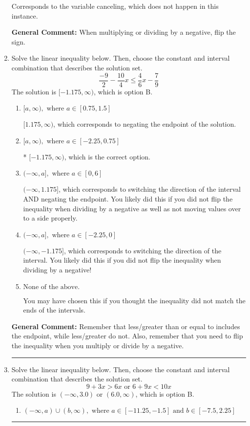 \documentclass{extbook}[14pt]
\newcommand{\litem}[1]{\item #1

\rule{\textwidth}{0.4pt}}
\begin{document}
\begin{enumerate}
{\begin{enumerate}[label=\Alph*.]
Corresponds to the variable canceling, which does not happen in this instance.
\end{enumerate}

\textbf{General Comment:} When multiplying or dividing by a negative, flip the sign.
}
\litem{
Solve the linear inequality below. Then, choose the constant and interval combination that describes the solution set.
\[ \frac{-9}{2} - \frac{10}{4} x \leq \frac{4}{6} x - \frac{7}{9} \]The solution is \( [-1.175, \infty) \), which is option B.\begin{enumerate}[label=\Alph*.]
\item \( [a, \infty), \text{ where } a \in [0.75, 1.5] \)

 $[1.175, \infty)$, which corresponds to negating the endpoint of the solution.
\item \( [a, \infty), \text{ where } a \in [-2.25, 0.75] \)

* $[-1.175, \infty)$, which is the correct option.
\item \( (-\infty, a], \text{ where } a \in [0, 6] \)

 $(-\infty, 1.175]$, which corresponds to switching the direction of the interval AND negating the endpoint. You likely did this if you did not flip the inequality when dividing by a negative as well as not moving values over to a side properly.
\item \( (-\infty, a], \text{ where } a \in [-2.25, 0] \)

 $(-\infty, -1.175]$, which corresponds to switching the direction of the interval. You likely did this if you did not flip the inequality when dividing by a negative!
\item \( \text{None of the above}. \)

You may have chosen this if you thought the inequality did not match the ends of the intervals.
\end{enumerate}

\textbf{General Comment:} Remember that less/greater than or equal to includes the endpoint, while less/greater do not. Also, remember that you need to flip the inequality when you multiply or divide by a negative.
}
\litem{
Solve the linear inequality below. Then, choose the constant and interval combination that describes the solution set.
\[ 9 + 3 x > 6 x \text{ or } 6 + 9 x < 10 x \]The solution is \( (-\infty, 3.0) \text{ or } (6.0, \infty) \), which is option B.\begin{enumerate}[label=\Alph*.]
\item \( (-\infty, a) \cup (b, \infty), \text{ where } a \in [-11.25, -1.5] \text{ and } b \in [-7.5, 2.25] \)


\end{enumerate}}
\end{enumerate}
\end{document}
